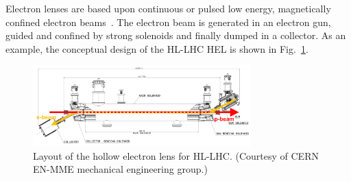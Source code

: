\documentclass[%
 reprint,
 amsmath,amssymb,
 aps,
prstab,
]{revtex4-1}
\begin{document}
Electron lenses are based upon continuous or pulsed low energy,
magnetically confined electron
beams~\cite{Shiltsev:elens-book:2016}. The electron beam is generated
in an electron gun, guided and confined by strong solenoids and
finally dumped in a collector. As an example, the conceptual design of
the HL-LHC HEL is shown in Fig.~\ref{fig:hel_layout}.


\begin{figure}
  \includegraphics[width=0.75\textwidth]{hel_layout_epbeam}
  \caption{Layout of the hollow electron lens for HL-LHC. (Courtesy of
    CERN EN-MME mechanical engineering group.)}
  \label{fig:hel_layout}
\end{figure}
\end{document}
